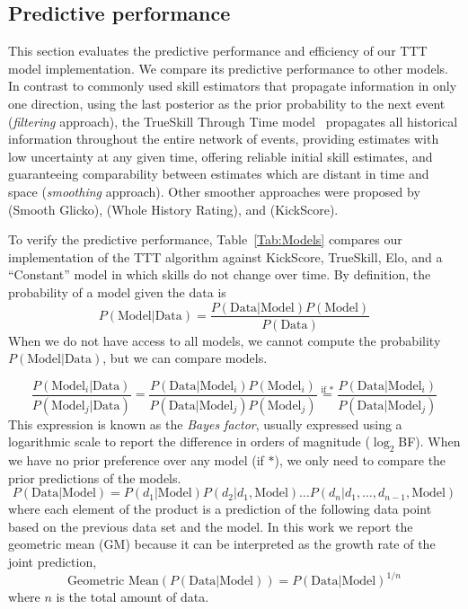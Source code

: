\documentclass[article]{jss}
\begin{document}
\subsection{Predictive performance}

This section evaluates the predictive performance and efficiency of our TTT model implementation.
We compare its predictive performance to other models. 
In contrast to commonly used skill estimators that propagate information in only one direction, using the last posterior as the prior probability to the next event (\emph{filtering} approach), the TrueSkill Through Time model~\citep{Dangauthier2007} propagates all historical information throughout the entire network of events, providing estimates with low uncertainty at any given time, offering reliable initial skill estimates, and guaranteeing comparability between estimates which are distant in time and space (\emph{smoothing} approach).
Other smoother approaches were proposed by \cite{Glickman1999} (Smooth Glicko), \cite{Coulom2008} (Whole History Rating), and \cite{Maystre2019} (KickScore).


To verify the predictive performance, Table~\ref{Tab:Models} compares our implementation of the TTT algorithm against KickScore, TrueSkill, Elo, and a ``Constant'' model in which skills do not change over time.
By definition, the probability of a model given the data is
%
\begin{equation}
 P(\text{Model}|\text{Data}) = \frac{P(\text{Data}|\text{Model})P(\text{Model})}{P(\text{Data})}
\end{equation}
%
When we do not have access to all models, we cannot compute the probability $P(\text{Model}|\text{Data})$, but we can compare models.

\begin{equation}\label{eq:bayes_factor}
 \frac{P(\text{Model}_i|\text{Data})}{P(\text{Model}_j|\text{Data})} = \frac{P(\text{Data}|\text{Model}_i)P(\text{Model}_i)}{P(\text{Data}|\text{Model}_j)P(\text{Model}_j)} \overset{\text{if } *}{=} \frac{P(\text{Data}|\text{Model}_i)}{P(\text{Data}|\text{Model}_j)}
\end{equation}
This expression is known as the \emph{Bayes factor}, usually expressed using a logarithmic scale to report the difference in orders of magnitude ($\log_2$BF).
%
When we have no prior preference over any model (if $*$), we only need to compare the prior predictions of the models.
%
\begin{equation}
P(\text{Data}|\text{Model}) = P(d_1|\text{Model})P(d_2|d_1,\text{Model}) \dots P(d_n|d_1,\dots, d_{n-1},\text{Model})
\end{equation}
%
where each element of the product is a prediction of the following data point based on the previous data set and the model.
%
In this work we report the geometric mean (GM) because it can be interpreted as the growth rate of the joint prediction,
%
\begin{equation}\label{eq:gmean}
\text{Geometric Mean}(P(\text{Data}|\text{Model})) = P(\text{Data}|\text{Model})^{1/n}
\end{equation}
%
where $n$ is the total amount of data.
\end{document}
